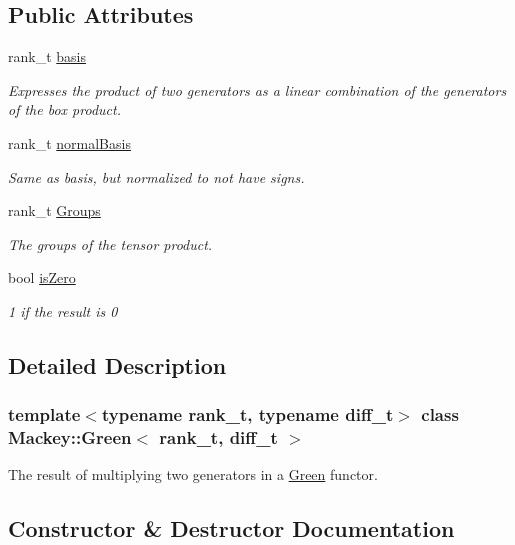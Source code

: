 \subsection*{Public Attributes}
\begin{DoxyCompactItemize}
\item 
rank\+\_\+t \hyperlink{classMackey_1_1Green_a248298bf608a1f0e7e5c448a6a38ae80}{basis}
\begin{DoxyCompactList}\small\item\em Expresses the product of two generators as a linear combination of the generators of the box product. \end{DoxyCompactList}\item 
rank\+\_\+t \hyperlink{classMackey_1_1Green_a7fd2fac9558c75fdef0b0ded1bee70d8}{normal\+Basis}
\begin{DoxyCompactList}\small\item\em Same as basis, but normalized to not have signs. \end{DoxyCompactList}\item 
rank\+\_\+t \hyperlink{classMackey_1_1Green_acfa5ea708949024bd24f1c1e21399cbc}{Groups}
\begin{DoxyCompactList}\small\item\em The groups of the tensor product. \end{DoxyCompactList}\item 
bool \hyperlink{classMackey_1_1Green_a12a01a6d1715538af0bdc6b34fad6b85}{is\+Zero}
\begin{DoxyCompactList}\small\item\em 1 if the result is 0 \end{DoxyCompactList}\end{DoxyCompactItemize}


\subsection{Detailed Description}
\subsubsection*{template$<$typename rank\+\_\+t, typename diff\+\_\+t$>$\newline
class Mackey\+::\+Green$<$ rank\+\_\+t, diff\+\_\+t $>$}

The result of multiplying two generators in a \hyperlink{classMackey_1_1Green}{Green} functor. 

\subsection{Constructor \& Destructor Documentation}
\mbox{\label{classMackey_1_1Green_a69095b3ff3f46ce70240df08aa1ba55b}} 
